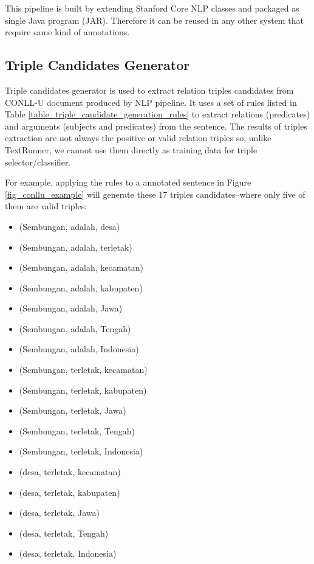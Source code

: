 \documentclass[conference,compsoc]{IEEEtran}
\begin{document}
This pipeline is built by extending Stanford Core NLP classes and packaged as single Java program (JAR). Therefore it can be reused in any other system that require same kind of annotations.

\subsection{Triple Candidates Generator} \label{Triple Candidates Generator}


Triple candidates generator is used to extract relation triples candidates from CONLL-U document produced by NLP pipeline. It uses a set of rules listed in Table \ref{table_triple_candidate_generation_rules} to extract relations (predicates) and arguments (subjects and predicates) from the sentence. The results of triples extraction are not always the positive or valid relation triples so, unlike TextRunner\cite{banko2007open}, we cannot use them directly as training data for triple selector/classifier.

For example, applying the rules to a annotated sentence in Figure \ref{fig_conllu_example} will generate these 17 triples candidates--where only five of them are valid triples:

\begin{itemize}
\item (Sembungan, adalah, desa) 
\item (Sembungan, adalah, terletak)
\item (Sembungan, adalah, kecamatan)
\item (Sembungan, adalah, kabupaten)
\item (Sembungan, adalah, Jawa)
\item (Sembungan, adalah, Tengah)
\item (Sembungan, adalah, Indonesia)
\item (Sembungan, terletak, kecamatan) 
\item (Sembungan, terletak, kabupaten) 
\item (Sembungan, terletak, Jawa) 
\item (Sembungan, terletak, Tengah)
\item (Sembungan, terletak, Indonesia) 
\item (desa, terletak, kecamatan)
\item (desa, terletak, kabupaten)
\item (desa, terletak, Jawa)
\item (desa, terletak, Tengah)
\item (desa, terletak, Indonesia)
\end{itemize}
\end{document}

